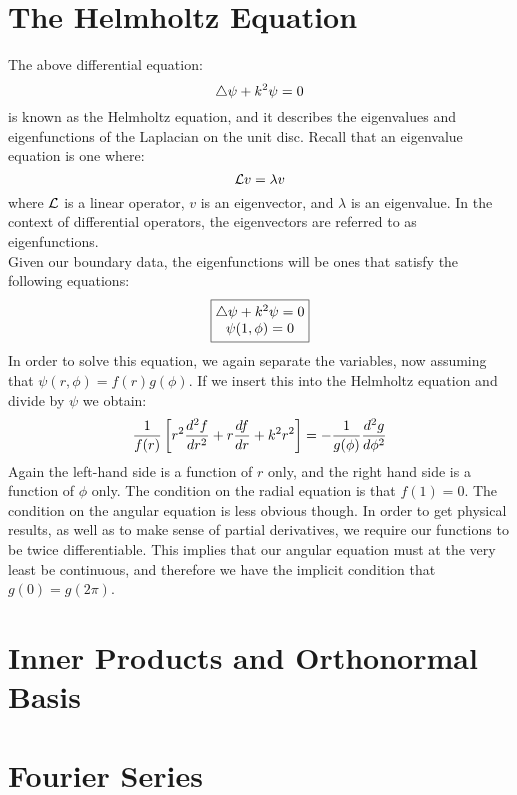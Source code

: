\documentclass{paper}
\begin{document}
\section{The Helmholtz Equation}
The above differential equation:
\begin{equation}
  \bigtriangleup \psi+k^2\psi=0
\end{equation}
is known as the Helmholtz equation, and it describes the eigenvalues and eigenfunctions of the Laplacian on the unit disc. Recall that an eigenvalue equation is one where:
\begin{equation}
  \mathcal{L}v = \lambda v
\end{equation}
where $\mathcal{L}$ is a linear operator, $v$ is an eigenvector, and $\lambda$ is an eigenvalue. In the context of differential operators, the eigenvectors are referred to as eigenfunctions.\\
Given our boundary data, the eigenfunctions will be ones that satisfy the following equations:
\begin{equation}
  \boxed{
    \begin{matrix}
      \bigtriangleup \psi+k^2\psi=0 \\ 
      \psi(1,\phi) = 0
    \end{matrix}
  }
\end{equation}
In order to solve this equation, we again separate the variables, now assuming that $\psi(r,\phi)=f(r)g(\phi)$. If we insert this into the Helmholtz equation and divide by $\psi$ we obtain:
\begin{equation}
  \frac{1}{f(r)}\left[r^2 \frac{d ^2 f}{d r^2} + r \frac{d f}{d r}+k^2 r^2\right] = -\frac{1}{g(\phi)}\frac{d ^2 g}{d \phi^2}
\end{equation}
Again the left-hand side is a function of $r$ only, and the right hand side is a function of $\phi$ only. The condition on the radial equation is that $f(1) = 0$. The condition on the angular equation is less obvious though. In order to get physical results, as well as to make sense of partial derivatives, we require our functions to be twice differentiable. This implies that our angular equation must at the very least be continuous, and therefore we have the implicit condition that $g(0)=g(2\pi)$.
\section{Inner Products and Orthonormal Basis}
\section{Fourier Series}
\end{document}
